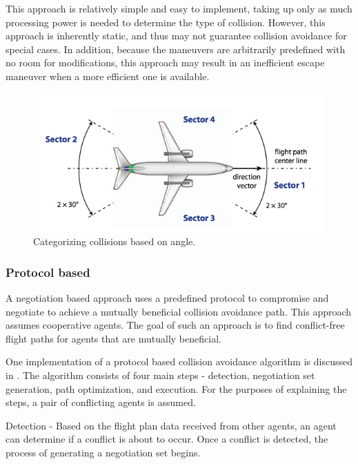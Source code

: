 \documentclass[conference]{IEEEtran}
\begin{document}
This approach is relatively simple and easy to implement, taking up only as much processing power is needed to determine the type of collision. However, this approach is inherently static, and thus may not guarantee collision avoidance for special cases. In addition, because the maneuvers are arbitrarily predefined with no room for modifications, this approach may result in an inefficient escape maneuver when a more efficient one is available. 
\begin{figure}[h]
	\includegraphics [width=1\columnwidth] {06SislakCollisionId}
	\caption{Categorizing collisions based on angle. \cite{sislak2006negotiation}}
	\label{fig:06SislakID}
\end{figure}
\subsubsection{Protocol based}

A negotiation based approach uses a predefined protocol to compromise and negotiate to achieve a mutually beneficial collision avoidance path. This approach assumes cooperative agents. The goal of such an approach is to find conflict-free flight paths for agents that are mutually beneficial.

One implementation of a protocol based collision avoidance algorithm is discussed in \cite{vsivslak2008agentfly}. The algorithm consists of four main steps - detection, negotiation set generation, path optimization, and execution. For the purposes of explaining the steps, a pair of conflicting agents is assumed.

Detection - Based on the flight plan data received from other agents, an agent can determine if a conflict is about to occur. Once a conflict is detected, the process of generating a negotiation set begins.
\end{document}
